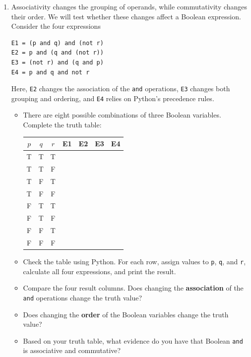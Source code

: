 \documentclass{article}
\begin{document}
\begin{enumerate}

\item Associativity changes the grouping of operands, while
commutativity changes their order.  We will test whether these
changes affect a Boolean expression.  Consider the four expressions

\begin{verbatim}
E1 = (p and q) and (not r)
E2 = p and (q and (not r))
E3 = (not r) and (q and p)
E4 = p and q and not r
\end{verbatim}

Here, \texttt{E2} changes the association of the
\texttt{and} operations, \texttt{E3} changes both grouping
and ordering, and \texttt{E4} relies on Python's precedence
rules.

\begin{itemize}

\item There are eight possible combinations of three Boolean
variables.  Complete the truth table:

\begin{center}
\setlength{\tabcolsep}{3pt}
\begin{tabular}{ccc|cccc}
$p$ & $q$ & $r$ &
E1 & E2 & E3 & E4 \\ \hline
T & T & T & & & & \\
T & T & F & & & & \\
T & F & T & & & & \\
T & F & F & & & & \\
F & T & T & & & & \\
F & T & F & & & & \\
F & F & T & & & & \\
F & F & F & & & &
\end{tabular}
\end{center}

\item Check the table using Python.  For each row, assign
values to \texttt{p}, \texttt{q}, and \texttt{r}, calculate
all four expressions, and print the result.

\item Compare the four result columns.  Does changing the
\textbf{association} of the \texttt{and} operations change
the truth value?

\item Does changing the \textbf{order} of the Boolean
variables change the truth value?

\item Based on your truth table, what evidence do you have
that Boolean \texttt{and} is associative and commutative?

\end{itemize}
\end{enumerate}
\end{document}
